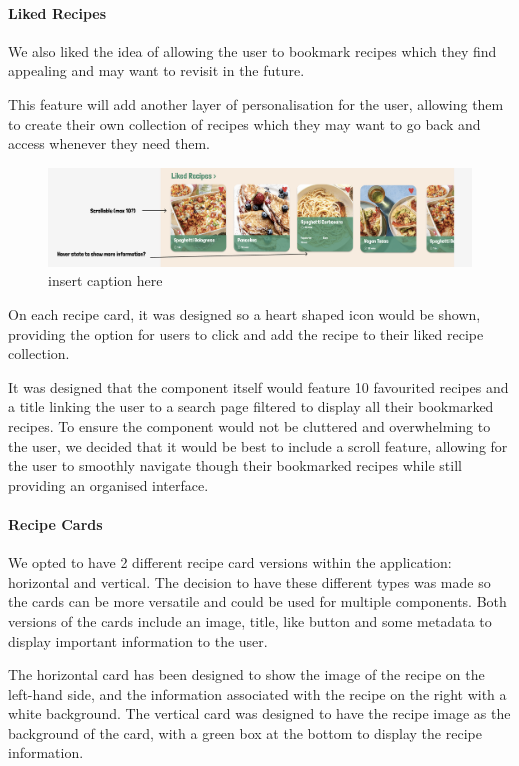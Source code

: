 \documentclass{article}
\begin{document}
\paragraph{Liked Recipes}
We also liked the idea of allowing the user to bookmark recipes which they find appealing and may want to revisit in the future. 

This feature will add another layer of personalisation for the user, allowing them to create their own collection of recipes which they may want to go back and access whenever they need them. 

\begin{figure}[htbp]
  \includegraphics[width=1.0\textwidth]{assets/Version 1 Liked Recipes.png}
  \centering
  \caption{insert caption here}
\end{figure}


On each recipe card, it was designed so a heart shaped icon would be shown, providing the option for users to click and add the recipe to their liked recipe collection. 

It was designed that the component itself would feature 10 favourited recipes and a title linking the user to a search page filtered to display all their bookmarked recipes. To ensure the component would not be cluttered and overwhelming to the user, we decided that it would be best to include a scroll feature, allowing for the user to smoothly navigate though their bookmarked recipes while still providing an organised interface. 

\paragraph{Recipe Cards}
We opted to have 2 different recipe card versions within the application: horizontal and vertical. The decision to have these different types was made so the cards can be more versatile and could be used for multiple components. Both versions of the cards include an image, title, like button and some metadata to display important information to the user. 

The horizontal card has been designed to show the image of the recipe on the left-hand side, and the information associated with the recipe on the right with a white background. The vertical card was designed to have the recipe image as the background of the card, with a green box at the bottom to display the recipe information.
\end{document}

